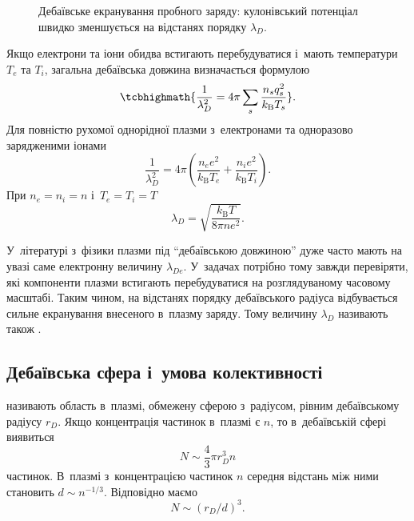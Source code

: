 \begin{figure}[htbp]\centering
	\caption{Дебаївське екранування пробного заряду: кулонівський потенціал швидко зменшується на відстанях порядку $\lambda_D$.}\label{fig:debye-screening}
\end{figure}

Якщо електрони та іони обидва встигають перебудуватися і~мають температури $T_e$ та $T_i$, загальна дебаївська довжина визначається формулою
\begin{equation}
	\tcbhighmath{
		\frac{1}{\lambda_D^2}
		=4\pi\sum_s\frac{n_s q_s^2}{k_{\mathrm B}T_s}
	}.
\end{equation}
Для повністю рухомої однорідної плазми з~електронами та одноразово зарядженими іонами
\begin{equation}
	\frac{1}{\lambda_D^2}
	=4\pi\left(
	\frac{n_e e^2}{k_{\mathrm B}T_e}
	+\frac{n_i e^2}{k_{\mathrm B}T_i}\right).
\end{equation}
При $n_e=n_i=n$ і~$T_e=T_i=T$
\begin{equation}
	\lambda_D
	=\sqrt{\frac{k_{\mathrm B}T}{8\pi ne^2}}.
\end{equation}

У~літературі з~фізики плазми під \enquote{дебаївською довжиною} дуже часто мають на увазі саме електронну величину $\lambda_{De}$. У~задачах потрібно тому завжди перевіряти, які компоненти плазми встигають перебудуватися на розглядуваному часовому масштабі. Таким чином, на відстанях порядку дебаївського радіуса відбувається сильне екранування внесеного в~плазму заряду. Тому величину $\lambda_D$ називають також .

\subsection{Дебаївська сфера і~умова колективності}

 називають область в~плазмі, обмежену сферою з~радіусом, рівним дебаївському радіусу $r_D$. Якщо концентрація частинок в~плазмі є $n$, то в~дебаївській сфері виявиться
\begin{equation*}
	N \sim \frac{4}{3}\pi r_D^3 n
\end{equation*}
частинок. В~плазмі з~концентрацією частинок $n$ середня відстань між ними становить $d \sim n^{-1/3}$. Відповідно маємо
\begin{equation*}
	N \sim (r_D/d)^3.
\end{equation*}

